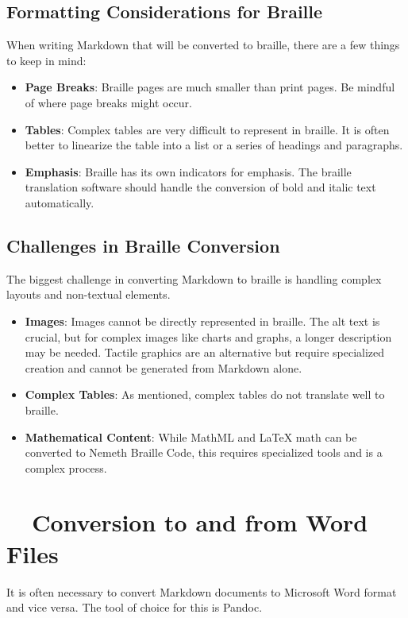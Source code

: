 \subsection{Formatting Considerations for Braille}
\label{subsec:braille-formatting-considerations}
When writing Markdown that will be converted to braille, there are a few things to keep in mind:
\begin{itemize}
	\item \textbf{Page Breaks}: Braille pages are much smaller than print pages. Be mindful of where page breaks might occur.
	\item \textbf{Tables}: Complex tables are very difficult to represent in braille. It is often better to linearize the table into a list or a series of headings and paragraphs.
	\item \textbf{Emphasis}: Braille has its own indicators for emphasis. The braille translation software should handle the conversion of bold and italic text automatically.
\end{itemize}

\subsection{Challenges in Braille Conversion}
\label{subsec:braille-conversion-challenges}
The biggest challenge in converting Markdown to braille is handling complex layouts and non-textual elements.
\begin{itemize}
	\item \textbf{Images}: Images cannot be directly represented in braille. The alt text is crucial, but for complex images like charts and graphs, a longer description may be needed. Tactile graphics are an alternative but require specialized creation and cannot be generated from Markdown alone.
	\item \textbf{Complex Tables}: As mentioned, complex tables do not translate well to braille.
	\item \textbf{Mathematical Content}: While MathML and LaTeX math can be converted to Nemeth Braille Code, this requires specialized tools and is a complex process.
\end{itemize}

\section{~~Conversion to and from Word Files}
\label{sec:markdown-word-conversion}
It is often necessary to convert Markdown documents to Microsoft Word format and vice versa. The tool of choice for this is Pandoc.

